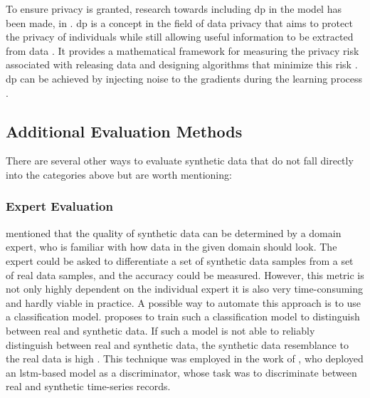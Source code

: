 To ensure privacy is granted, research towards including \gls{dp} \cite{dwork2008DifferentialPrivacySurvey} in the model has been made, \eg in \cite{xie2018DifferentiallyPrivateGenerative, jordon2018PATEGANGeneratingSynthetic, torfi2022DifferentiallyPrivateSynthetic}.
\gls{dp} is a concept in the field of data privacy that aims to protect the privacy of individuals while still allowing useful information to be extracted from data \cite{dwork2008DifferentialPrivacySurvey}. 
It provides a mathematical framework for measuring the privacy risk associated with releasing data and designing algorithms that minimize this risk \cite{dwork2008DifferentialPrivacySurvey, zhao2022CTABGANEnhancingTabular}.
\gls{dp} can be achieved by injecting noise to the gradients during the learning process \cite{xie2018DifferentiallyPrivateGenerative}.

\subsection{Additional Evaluation Methods}
\label{ch:preliminaries-evaluationOfSyntheticTabularData-otherMetrics}

There are several other ways to evaluate synthetic data that do not fall directly into the categories above but are worth mentioning:

\subsubsection{Expert Evaluation}  
\textcite{elemam2020SevenWaysEvaluate} mentioned that the quality of synthetic data can be determined by a domain expert, 
who is familiar with how data in the given domain should look.
The expert could be asked to differentiate a set of synthetic data samples from a set of real data samples, and the accuracy could be measured.
However, this metric is not only highly dependent on the individual expert it is also very time-consuming and hardly viable in practice.
A possible way to automate this approach is to use a classification model.
\textcite{elemam2020SevenWaysEvaluate} proposes to train such a classification model to distinguish between real and synthetic data.
If such a model is not able to reliably distinguish between real and synthetic data, the synthetic data resemblance to the real data is high \textcite[p. 57]{elemam2020SevenWaysEvaluate}.
This technique was employed in the work of \textcite{alzantot2017SenseGenDeepLearning}, who deployed an \gls{lstm}-based model as a discriminator, whose task was to discriminate between real and synthetic time-series records.

